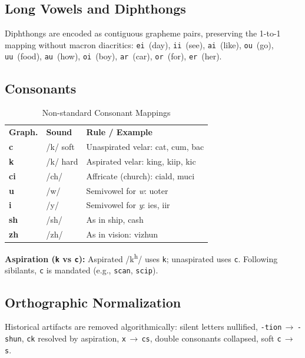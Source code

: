 \documentclass[12pt,onecolumn,letterpaper]{article}
\newcommand{\me}[1]{\texttt{#1}}
\newcommand{\MEtablelayout}{%
\footnotesize
\setlength{\tabcolsep}{6pt}%
\renewcommand{\arraystretch}{1.12}%
\arrayrulecolor{MERule}%
}
\begin{document}
\subsection{Long Vowels and Diphthongs}
Diphthongs are encoded as contiguous grapheme pairs, preserving the 1-to-1
mapping without macron diacritics: \me{ei}~(day), \me{ii}~(see),
\me{ai}~(like), \me{ou}~(go), \me{uu}~(food), \me{au}~(how),
\me{oi}~(boy), \me{ar}~(car), \me{or}~(for), \me{er}~(her).

\subsection{Consonants}

\begin{table}[h!]
\centering
\MEtablelayout
\begin{tabularx}{\linewidth}{llX}
\rowcolor{MEGray}
\textbf{Graph.} & \textbf{Sound} & \textbf{Rule / Example} \\
\textbf{c}  & /k/ soft      & Unaspirated velar: cat, cum, bac \\
\textbf{k}  & /k/ hard      & Aspirated velar: king, kiip, kic \\
\textbf{ci} & /ch/          & Affricate (church): ciald, muci \\
\textbf{u}  & /w/           & Semivowel for \textit{w}: uoter \\
\textbf{i}  & /y/           & Semivowel for \textit{y}: ies, iir \\
\textbf{sh} & /sh/          & As in ship, cash \\
\textbf{zh} & /zh/          & As in vision: vizhun \\
\bottomrule
\end{tabularx}
\caption{Non-standard Consonant Mappings}
\end{table}

\textbf{Aspiration (\me{k} vs \me{c}):} Aspirated /k\textsuperscript{h}/
uses \me{k}; unaspirated uses \me{c}. Following sibilants, \me{c} is
mandated (e.g., \me{scan}, \me{scip}).

\subsection{Orthographic Normalization}
Historical artifacts are removed algorithmically: silent letters nullified,
\me{-tion}\,$\to$\,\me{-shun}, \me{ck} resolved by aspiration,
\me{x}\,$\to$\,\me{cs}, double consonants collapsed, soft \me{c}\,$\to$\,\me{s}.
\end{document}
